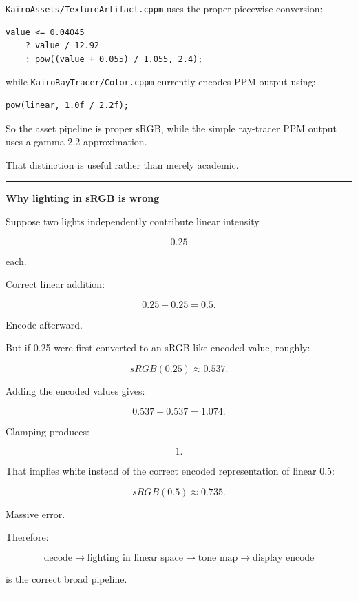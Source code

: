 \texttt{KairoAssets/TextureArtifact.cppm} uses the proper piecewise conversion:

\begin{verbatim}
value <= 0.04045
    ? value / 12.92
    : pow((value + 0.055) / 1.055, 2.4);
\end{verbatim}

while \texttt{KairoRayTracer/Color.cppm} currently encodes PPM output using:

\begin{verbatim}
pow(linear, 1.0f / 2.2f);
\end{verbatim}

So the asset pipeline is proper sRGB, while the simple ray-tracer PPM output uses a gamma-2.2 approximation.

That distinction is useful rather than merely academic.

\begin{center}\rule{0.5\linewidth}{0.5pt}\end{center}

\textbf{Why lighting in sRGB is wrong}

Suppose two lights independently contribute linear intensity

\[
0.25
\]

each.

Correct linear addition:

\[
0.25+0.25=0.5.
\]

Encode afterward.

But if 0.25 were first converted to an sRGB-like encoded value, roughly:

\[
sRGB(0.25)\approx0.537.
\]

Adding the encoded values gives:

\[
0.537+0.537=1.074.
\]

Clamping produces:

\[
1.
\]

That implies white instead of the correct encoded representation of linear 0.5:

\[
sRGB(0.5)\approx0.735.
\]

Massive error.

Therefore:

\[
\boxed{
\text{decode}
\rightarrow
\text{lighting in linear space}
\rightarrow
\text{tone map}
\rightarrow
\text{display encode}
}
\]

is the correct broad pipeline.

\begin{center}\rule{0.5\linewidth}{0.5pt}\end{center}

